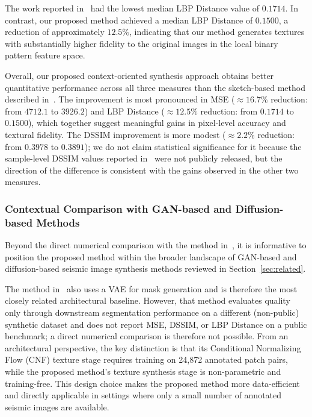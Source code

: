 \documentclass{ieeeaccess}
\begin{document}
The work reported in~\cite{Ferreira2020} had the lowest median LBP Distance value of $0.1714$. In contrast, our proposed method achieved a median LBP Distance of $0.1500$, a reduction of approximately $12.5\%$, indicating that our method generates textures with substantially higher fidelity to the original images in the local binary pattern feature space.

Overall, our proposed context-oriented synthesis approach obtains better quantitative performance across all three measures than the sketch-based method described in~\cite{Ferreira2020}. The improvement is most pronounced in MSE ($\approx 16.7\%$ reduction: from $4712.1$ to $3926.2$) and LBP Distance ($\approx 12.5\%$ reduction: from $0.1714$ to $0.1500$), which together suggest meaningful gains in pixel-level accuracy and textural fidelity. The DSSIM improvement is more modest ($\approx 2.2\%$ reduction: from $0.3978$ to $0.3891$); we do not claim statistical significance for it because the sample-level DSSIM values reported in~\cite{Ferreira2020} were not publicly released, but the direction of the difference is consistent with the gains observed in the other two measures.

\subsubsection{Contextual Comparison with GAN-based and Diffusion-based Methods}

Beyond the direct numerical comparison with the method in~\cite{Ferreira2020}, it is informative to position the proposed method within the broader landscape of GAN-based and diffusion-based seismic image synthesis methods reviewed in Section~\ref{sec:related}.

The method in~\cite{Henriques2021} also uses a VAE for mask generation and is therefore the most closely related architectural baseline. However, that method evaluates quality only through downstream segmentation performance on a different (non-public) synthetic dataset and does not report MSE, DSSIM, or LBP Distance on a public benchmark; a direct numerical comparison is therefore not possible. From an architectural perspective, the key distinction is that its Conditional Normalizing Flow (CNF) texture stage requires training on 24,872 annotated patch pairs, while the proposed method's texture synthesis stage is non-parametric and training-free. This design choice makes the proposed method more data-efficient and directly applicable in settings where only a small number of annotated seismic images are available.
\end{document}
